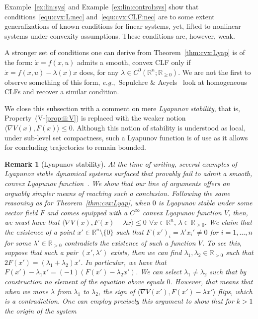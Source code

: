 \documentclass[letterpaper, 10 pt, conference]{ieeeconf}  %
\theoremstyle{mystyle}
\newtheorem{remark}[theorem]{Remark}
\begin{document}
Example~\ref{ex:lin:sys} and Example~\ref{ex:lin:control:sys} show that conditions~\eqref{equ:cvx:L:nec} and~\eqref{equ:cvx:CLF:nec} are to some extent generalizations of known conditions for linear systems, yet, lifted to nonlinear systems under convexity assumptions. These conditions are, however, weak. 

A stronger set of conditions one can derive from Theorem~\ref{thm:cvx:Lyap} is of the form: $\dot{x}=f(x,u)$ admits a smooth, convex CLF only if $\dot{x}=f(x,u)-\lambda(x)x$ does, for any $\lambda\in C^{0}(\mathbb{R}^n;\mathbb{R}_{\geq 0})$.
We are not the first to observe something of this form, \textit{e.g.},~Sepulchre \& Aeyels~ \cite[Sec.~4.1]{ref:sepulchre1996homogeneous} look at homogeneous CLFs and recover a similar condition. 

{
 We close this subsection with a comment on mere \textit{Lyapunov stability}, {that is, Property~(V-\ref{prop:ii:V}) is replaced with the weaker notion $\langle \nabla V(x),F(x) \rangle \leq 0$. Although this notion of stability is understood as local, under sub-level set compactness, such a Lyapunov function is of use as it allows for concluding trajectories to remain bounded.}  
\begin{remark}[Lyapunov stability]
 At the time of writing, several examples of Lyapunov stable dynamical systems surfaced that provably fail to admit a smooth, convex Lyapunov function~\cite{ref:akbarian2023introducing}. We show that our line of arguments offers an arguably simpler means of reaching such a conclusion. Following the same reasoning as for Theorem~\ref{thm:cvx:Lyap}, when $0$ is Lyapunov stable under some vector field $F$ and comes equipped with a $C^{\infty}$ convex Lyapunov function $V$, then, we must have that $\langle \nabla V(x), F(x) - \lambda x\rangle \leq 0$ $\forall x\in \mathbb{R}^n,\, \lambda \in \mathbb{R}_{\geq 0}$. We claim that the existence of a point $x'\in \mathbb{R}^n\setminus\{0\}$ such that $F(x')_i = \lambda' x_i' \neq 0$ for $i=1,\dots,n$ for some $\lambda'\in \mathbb{R}_{>0}$ contradicts the existence of such a function $V$. To see this, suppose that such a pair $(x',\lambda')$ exists, then we can find $\lambda_1,\lambda_2 \in \mathbb{R}_{>0}$ such that $2F(x')=(\lambda_1+\lambda_2)x'$. In particular, we have that $F(x')-\lambda_1 x' = (-1)(F(x')-\lambda_2 x')$. We can select $\lambda_1\neq \lambda_2$ such that by construction no element of the equation above equals $0$. However, that means that when we move $\lambda$ from $\lambda_1$ to $\lambda_2$, the sign of $\langle \nabla V(x'),F(x')-\lambda x'\rangle$ flips, which is a contradiction. One can employ precisely this argument to show that for $k>1$ the origin of the system

\end{remark}}
\end{document}
